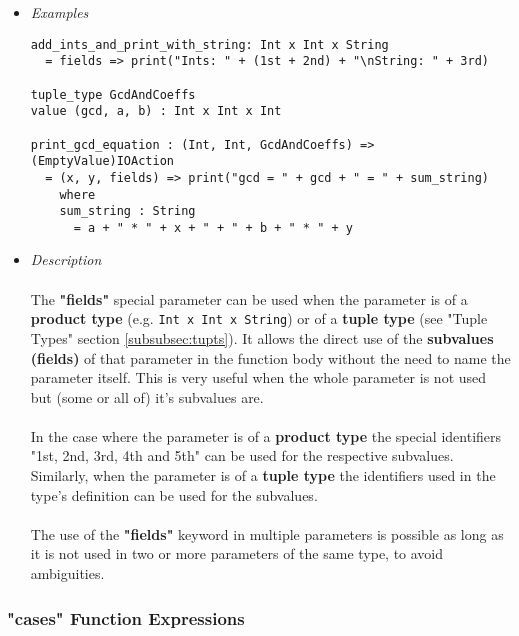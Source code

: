 \documentclass{article}
\begin{document}
\begin{itemize}

\item \textit{Examples}
\begin{verbatim}
add_ints_and_print_with_string: Int x Int x String
  = fields => print("Ints: " + (1st + 2nd) + "\nString: " + 3rd)

tuple_type GcdAndCoeffs
value (gcd, a, b) : Int x Int x Int

print_gcd_equation : (Int, Int, GcdAndCoeffs) => (EmptyValue)IOAction
  = (x, y, fields) => print("gcd = " + gcd + " = " + sum_string)
    where
    sum_string : String
      = a + " * " + x + " + " + b + " * " + y
\end{verbatim}

\item \textit{Description}\\\\
The \textbf{"fields"} special parameter can be used when the parameter is of a
\textbf{product type} (e.g. \texttt{Int x Int x String}) or of a \textbf{tuple
type} (see "Tuple Types" section \ref{subsubsec:tupts}).  It allows the direct
use of the \textbf{subvalues (fields)} of that parameter in the function body
without the need to name the parameter itself. This is very useful when the
whole parameter is not used but (some or all of) it's subvalues are.
\\\\
In the case where the parameter is of a \textbf{product type} the special identifiers
"1st, 2nd, 3rd, 4th and 5th" can be used for the respective subvalues.
Similarly, when the parameter is of a \textbf{tuple type} the identifiers used in
the type's definition can be used for the subvalues. 
\\\\
The use of the \textbf{"fields"} keyword in multiple parameters is possible as
long as it is not used in two or more parameters of the same type, to avoid 
ambiguities.

\end{itemize}

\subsubsection{"cases" Function Expressions}
\label{subsubsec:casessyntax}
\end{document}
